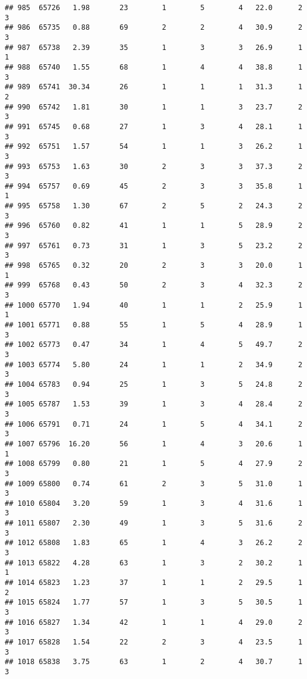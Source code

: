 \documentclass[
]{article}
\begin{document}
\begin{verbatim}
## 985  65726   1.98       23        1        5        4   22.0      2      3
## 986  65735   0.88       69        2        2        4   30.9      2      3
## 987  65738   2.39       35        1        3        3   26.9      1      1
## 988  65740   1.55       68        1        4        4   38.8      1      3
## 989  65741  30.34       26        1        1        1   31.3      1      2
## 990  65742   1.81       30        1        1        3   23.7      2      3
## 991  65745   0.68       27        1        3        4   28.1      1      3
## 992  65751   1.57       54        1        1        3   26.2      1      3
## 993  65753   1.63       30        2        3        3   37.3      2      3
## 994  65757   0.69       45        2        3        3   35.8      1      1
## 995  65758   1.30       67        2        5        2   24.3      2      3
## 996  65760   0.82       41        1        1        5   28.9      2      3
## 997  65761   0.73       31        1        3        5   23.2      2      3
## 998  65765   0.32       20        2        3        3   20.0      1      1
## 999  65768   0.43       50        2        3        4   32.3      2      3
## 1000 65770   1.94       40        1        1        2   25.9      1      1
## 1001 65771   0.88       55        1        5        4   28.9      1      3
## 1002 65773   0.47       34        1        4        5   49.7      2      3
## 1003 65774   5.80       24        1        1        2   34.9      2      3
## 1004 65783   0.94       25        1        3        5   24.8      2      3
## 1005 65787   1.53       39        1        3        4   28.4      2      3
## 1006 65791   0.71       24        1        5        4   34.1      2      3
## 1007 65796  16.20       56        1        4        3   20.6      1      1
## 1008 65799   0.80       21        1        5        4   27.9      2      3
## 1009 65800   0.74       61        2        3        5   31.0      1      3
## 1010 65804   3.20       59        1        3        4   31.6      1      3
## 1011 65807   2.30       49        1        3        5   31.6      2      3
## 1012 65808   1.83       65        1        4        3   26.2      2      3
## 1013 65822   4.28       63        1        3        2   30.2      1      1
## 1014 65823   1.23       37        1        1        2   29.5      1      2
## 1015 65824   1.77       57        1        3        5   30.5      1      3
## 1016 65827   1.34       42        1        1        4   29.0      2      3
## 1017 65828   1.54       22        2        3        4   23.5      1      3
## 1018 65838   3.75       63        1        2        4   30.7      1      3

\end{verbatim}
\end{document}
